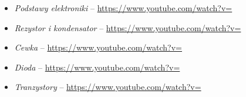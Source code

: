 % 
% 
% 
% 

\begin{itemize}
\item \emph{Podstawy elektroniki} – \url{https://www.youtube.com/watch?v=}
\item \emph{Rezystor i  kondensator} – \url{https://www.youtube.com/watch?v=}
\item \emph{Cewka} – \url{https://www.youtube.com/watch?v=}
\item \emph{Dioda} – \url{https://www.youtube.com/watch?v=}
\item \emph{Tranzystory} – \url{https://www.youtube.com/watch?v=}
\end{itemize}
